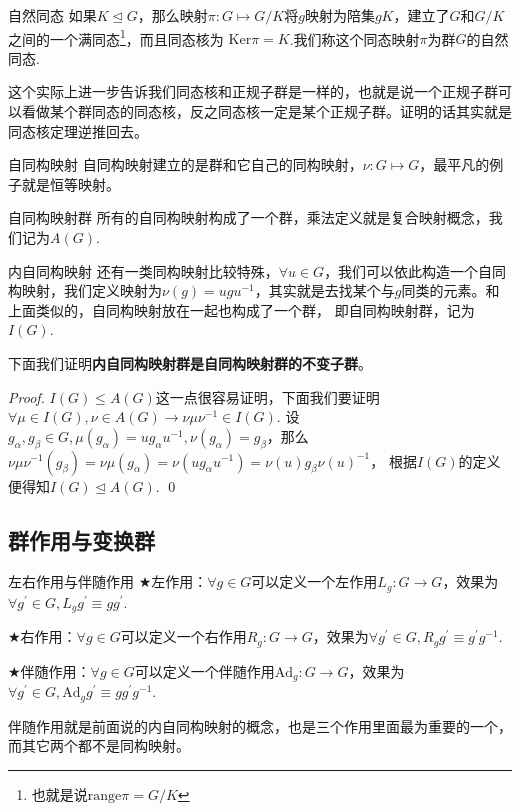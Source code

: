 \begin{define}{自然同态}
    如果$K\unlhd G$，那么映射$\pi:G\mapsto G/K$将$g$映射为陪集$gK$，建立了$G$和$G/K$之间的一个满同态\footnote[1]{也就是说$\mathrm{range}\pi=G/K$}，而且同态核为
    $\mathrm{Ker}\pi=K$.我们称这个同态映射$\pi$为群$G$的自然同态.
\end{define}
这个实际上进一步告诉我们同态核和正规子群是一样的，也就是说一个正规子群可以看做某个群同态的同态核，反之同态核一定是某个正规子群。证明的话其实就是同态核定理逆推回去。
\begin{define}{自同构映射}
    自同构映射建立的是群和它自己的同构映射，$\nu :G\mapsto G$，最平凡的例子就是恒等映射。    
\end{define}
\begin{define}{自同构映射群}
    所有的自同构映射构成了一个群，乘法定义就是复合映射概念，我们记为$A(G)$.
\end{define}
\begin{define}{内自同构映射}
    还有一类同构映射比较特殊，$\forall u\in G$，我们可以依此构造一个自同构映射，我们定义映射为$\nu(g)=ugu^{-1}$，其实就是去找某个与$g$同类的元素。和上面类似的，自同构映射放在一起也构成了一个群，
    即自同构映射群，记为$I(G)$.
\end{define}
下面我们证明\textbf{内自同构映射群是自同构映射群的不变子群}。
\begin{proof}
    $I(G)\leq A(G)$这一点很容易证明，下面我们要证明$\forall \mu\in I(G),\nu\in A(G)\rightarrow\nu\mu\nu^{-1}\in I(G)$. 设$g_\alpha,g_\beta\in G, 
    \mu(g_\alpha)=u g_\alpha u^{-1},\nu(g_\alpha)=g_\beta$，那么$\nu\mu\nu^{-1}(g_\beta)=\nu\mu(g_\alpha)=\nu(ug_\alpha u^{-1})=\nu(u)g_\beta \nu(u)^{-1}$，
    根据$I(G)$的定义便得知$I(G)\unlhd A(G)$.
    \qed
\end{proof}
\subsection{群作用与变换群}
\begin{define}{左右作用与伴随作用}
    $\bigstar$左作用：$\forall g\in G$可以定义一个左作用$L_g:G\rightarrow G$，效果为$\forall g^\prime \in G,L_gg^\prime\equiv gg^\prime$.
    
    $\bigstar$右作用：$\forall g\in G$可以定义一个右作用$R_g:G\rightarrow G$，效果为$\forall g^\prime \in G,R_gg^\prime\equiv g^\prime g^{-1}$.

    $\bigstar$伴随作用：$\forall g\in G$可以定义一个伴随作用$\mathrm{Ad}_g:G\rightarrow G$，效果为$\forall g^\prime \in G,\mathrm{Ad}_gg^\prime\equiv gg^\prime g^{-1}$.
\end{define}
伴随作用就是前面说的内自同构映射的概念，也是三个作用里面最为重要的一个，而其它两个都不是同构映射。

